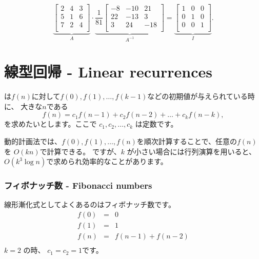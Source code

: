\[
\underbrace{
 \begin{bmatrix}
  2 & 4 & 3\\
  5 & 1 & 6\\
  7 & 2 & 4\\
 \end{bmatrix}
}_{A}
\cdot
\underbrace{
 \frac{1}{81}
 \begin{bmatrix}
   -8 & -10 & 21 \\
   22 & -13 & 3 \\
   3 & 24 & -18 \\
 \end{bmatrix}
}_{A^{-1}}
=
\underbrace{
 \begin{bmatrix}
  1 & 0 & 0 \\
  0 & 1 & 0 \\
  0 & 0 & 1 \\
 \end{bmatrix}
}_{I}.
\]

\section{線型回帰 - Linear recurrences}


は$f(n)$に対して$f(0),f(1),\ldots,f(k-1)$などの初期値が与えられている時に、
大きな$n$である
\[f(n) = c_1 f(n-1) + c_2 f(n-2) + \ldots + c_k f (n-k),\]
を求めたいとします。ここで $c_1,c_2,\ldots,c_k$ は定数です。

動的計画法では、$f(0),f(1),\ldots,f(n)$を順次計算することで、任意の$f(n)$を $O(kn)$で計算できる。
ですが、$k$ が小さい場合には行列演算を用いると、$O(k^3 \log n)$で求められ効率的なことがあります。

\subsubsection{フィボナッチ数 - Fibonacci numbers}


線形漸化式としてよくあるのはフィボナッチ数です。
\[
\begin{array}{lcl}
f(0) & = & 0 \\
f(1) & = & 1 \\
f(n) & = & f(n-1)+f(n-2) \\
\end{array}
\]
$k=2$ の時、 $c_1=c_2=1$です。

